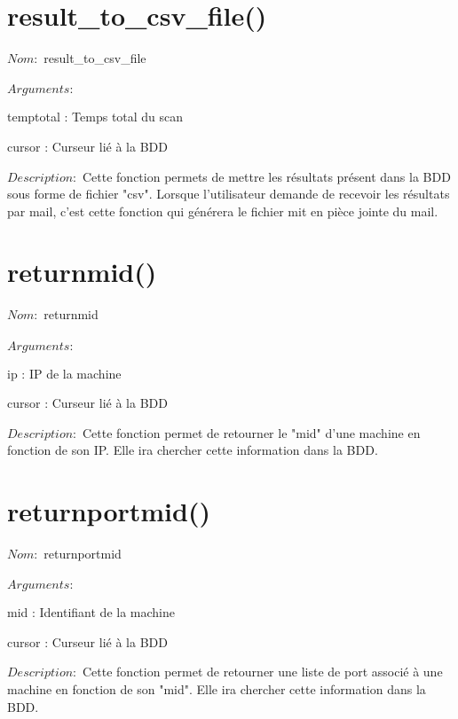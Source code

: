 \documentclass[12pt]{report}
\begin{document}
		\section{result\_to\_csv\_file()}
			{\setlength{\parindent}{0cm}
			$Nom :$ result\_to\_csv\_file\\\\
			}
			$Arguments :$
			\begin{description}
				\item temptotal : Temps total du scan
				\item cursor : Curseur lié à la BDD\\
			\end{description}
			$Description : $ Cette fonction permets de mettre les résultats présent dans la BDD sous forme de fichier "csv". Lorsque l'utilisateur demande de recevoir les résultats par mail, c'est cette fonction qui générera le fichier mit en pièce jointe du mail.
		\section{returnmid()}
			{\setlength{\parindent}{0cm}
			$Nom :$ returnmid\\\\
			}
			$Arguments :$
			\begin{description}
				\item ip : IP de la machine
				\item cursor : Curseur lié à la BDD\\
			\end{description}
			$Description : $ Cette fonction permet de retourner le "mid" d'une machine en fonction de son IP. Elle ira chercher cette information dans la BDD.
		\section{returnportmid()}
			{\setlength{\parindent}{0cm}
			$Nom :$ returnportmid\\\\
			}
			$Arguments :$
			\begin{description}
				\item mid : Identifiant de la machine
				\item cursor : Curseur lié à la BDD\\
			\end{description}
			$Description : $ Cette fonction permet de retourner une liste de port associé à une machine en fonction de son "mid". Elle ira chercher cette information dans la BDD.
\end{document}

